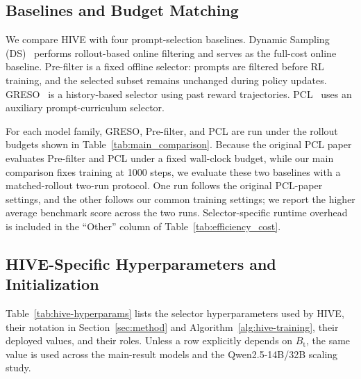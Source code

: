 \subsection{Baselines and Budget Matching}
\label{appendix-subsec:baselines-budget-matching}

We compare HIVE with four prompt-selection baselines. Dynamic Sampling (DS)~\cite{yu2025dapo} performs rollout-based online filtering and serves as the full-cost online baseline. Pre-filter is a fixed offline selector: prompts are filtered before RL training, and the selected subset remains unchanged during policy updates. GRESO~\cite{zheng2025act} is a history-based selector using past reward trajectories. PCL~\cite{Gao2025PCL} uses an auxiliary prompt-curriculum selector.

For each model family, GRESO, Pre-filter, and PCL are run under the rollout budgets shown in Table~\ref{tab:main_comparison}. Because the original PCL paper evaluates Pre-filter and PCL under a fixed wall-clock budget, while our main comparison fixes training at 1000 steps, we evaluate these two baselines with a matched-rollout two-run protocol. One run follows the original PCL-paper settings, and the other follows our common training settings; we report the higher average benchmark score across the two runs. Selector-specific runtime overhead is included in the ``Other'' column of Table~\ref{tab:efficiency_cost}.

\subsection{HIVE-Specific Hyperparameters and Initialization}
\label{appendix-subsec:hive-hyperparams}

Table~\ref{tab:hive-hyperparams} lists the selector hyperparameters used by HIVE, their notation in Section~\ref{sec:method} and Algorithm~\ref{alg:hive-training}, their deployed values, and their roles. Unless a row explicitly depends on $B_{\mathrm{t}}$, the same value is used across the main-result models and the Qwen2.5-14B/32B scaling study.

